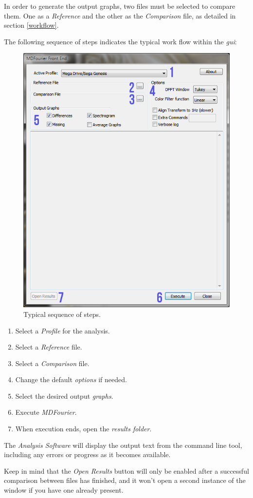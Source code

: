\documentclass[10pt,a4paper]{report}
\newcommand{\ac}[1]{\textit{\acrshort{#1}}}
\begin{document}
\begin{appendices}
In order to generate the output graphs, two files must be selected to compare them. One as a \textit{Reference} and the other as the \textit{Comparison} file, as detailed in section \ref{workflow}.

The following sequence of steps indicates the typical work flow within the \ac{gui}:

\begin{figure}[H]
	\centering
	\includegraphics[width=0.6\linewidth]{images/GUI/GUI2.png}
	\caption[Steps]{Typical sequence of steps.}
	\label{fig:gui2}
\end{figure}

\begin{enumerate}
	\item Select a \textit{Profile} for the analysis.
	\item Select a \textit{Reference} file.
	\item Select a \textit{Comparison} file.
	\item Change the default \textit{options} if needed.
	\item Select the desired output \textit{graphs}.
	\item Execute \textit{MDFourier}.
	\item When execution ends, open the \textit{results folder}.
\end{enumerate}

The \textit{Analysis Software} will display the output text from the command line tool, including any errors or progress as it becomes available.

Keep in mind that the \textit{Open Results} button will only be enabled after a successful comparison between files has finished, and it won't open a second instance of the window if you have one already present.


\end{appendices}
\end{document}
